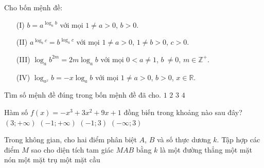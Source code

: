\begin{ex}%
	Cho bốn mệnh đề: \begin{enumerate}
		\item[(I)] $b = a ^{\log_a b}$ với mọi $1 \neq a > 0$, $b>0$.
		\item[(II)] $a^{\log_b c } = b ^{\log_a c}$ với mọi $1 \neq a >0$, $1 \neq b > 0$, $c>0$.
		\item[(III)] $\log_a b^{2m} = 2m \log_a b$ với mọi $0<a \neq 1$, $b\ \neq 0$, $m \in \mathbb{Z}^+$.
		\item[(IV)] $\log_{a^x} b = - x \log_a b$ với mọi $1 \neq a > 0$, $b > 0$, $x \in \mathbb{R}$.
	\end{enumerate}
	Tìm số mệnh đề đúng trong bốn mệnh đề đã cho.
	\choice
	{\True $1$}
	{$2$}
	{$3$}
	{$4$}
\end{ex}

\begin{ex}%
	Hàm số $f(x)= -x^3 + 3x^2 + 9x + 1$ đồng biến trong khoảng nào sau đây?
	\choice
	{$(3;+\infty)$}
	{$(-1;+ \infty)$}
	{\True $(-1;3)$}
	{$(-\infty ; 3)$}
\end{ex}

\begin{ex}%
	Trong không gian, cho hai điểm phân biệt $A$, $B$ và số thực dương $k$. Tập hợp các điểm $M$ sao cho diện tích tam giác $MAB$ bằng $k$ là
	\choice
	{một đường thẳng}
	{một mặt nón}
	{\True một mặt trụ}
	{một mặt cầu}
\end{ex}

